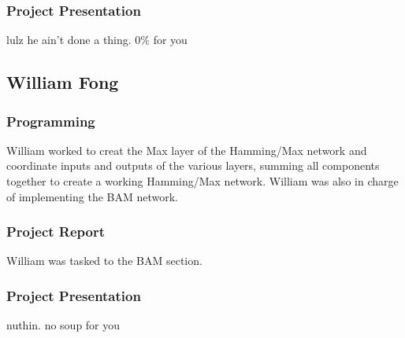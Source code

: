 \documentclass{article}
\begin{document}
\subsubsection{Project Presentation}
lulz he ain't done a thing.  0\% for you

\subsection{William Fong}
\subsubsection{Programming}
William worked to creat the Max layer of the Hamming/Max network and coordinate 
inputs and outputs of the various layers, summing all components together to create a working Hamming/Max network. William was also in charge of implementing the BAM network.

\subsubsection{Project Report}
William was tasked to the BAM section.

\subsubsection{Project Presentation}
nuthin. no soup for you 
\end{document}
